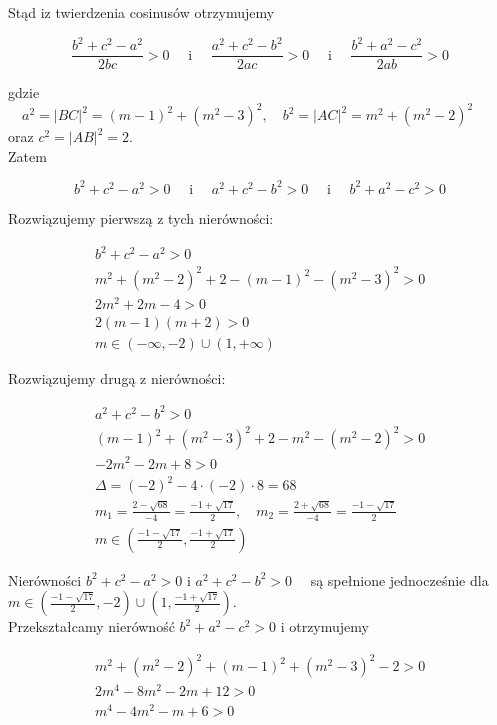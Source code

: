 \documentclass[10pt]{article}
\begin{document}
Stąd iz twierdzenia cosinusów otrzymujemy

$$
\frac{b^{2}+c^{2}-a^{2}}{2 b c}>0 \quad \text { i } \quad \frac{a^{2}+c^{2}-b^{2}}{2 a c}>0 \quad \text { i } \quad \frac{b^{2}+a^{2}-c^{2}}{2 a b}>0
$$

gdzie $\quad a^{2}=|B C|^{2}=(m-1)^{2}+\left(m^{2}-3\right)^{2}, \quad b^{2}=|A C|^{2}=m^{2}+\left(m^{2}-2\right)^{2} \quad$ oraz $c^{2}=|A B|^{2}=2$.\\
Zatem

$$
b^{2}+c^{2}-a^{2}>0 \quad \text { i } \quad a^{2}+c^{2}-b^{2}>0 \quad \text { i } \quad b^{2}+a^{2}-c^{2}>0
$$

Rozwiązujemy pierwszą z tych nierówności:

$$
\begin{gathered}
b^{2}+c^{2}-a^{2}>0 \\
m^{2}+\left(m^{2}-2\right)^{2}+2-(m-1)^{2}-\left(m^{2}-3\right)^{2}>0 \\
2 m^{2}+2 m-4>0 \\
2(m-1)(m+2)>0 \\
m \in(-\infty,-2) \cup(1,+\infty)
\end{gathered}
$$

Rozwiązujemy drugą z nierówności:

$$
\begin{gathered}
a^{2}+c^{2}-b^{2}>0 \\
(m-1)^{2}+\left(m^{2}-3\right)^{2}+2-m^{2}-\left(m^{2}-2\right)^{2}>0 \\
-2 m^{2}-2 m+8>0 \\
\Delta=(-2)^{2}-4 \cdot(-2) \cdot 8=68 \\
m_{1}=\frac{2-\sqrt{68}}{-4}=\frac{-1+\sqrt{17}}{2}, \quad m_{2}=\frac{2+\sqrt{68}}{-4}=\frac{-1-\sqrt{17}}{2} \\
m \in\left(\frac{-1-\sqrt{17}}{2}, \frac{-1+\sqrt{17}}{2}\right)
\end{gathered}
$$

Nierówności $b^{2}+c^{2}-a^{2}>0$ i $a^{2}+c^{2}-b^{2}>0 \quad$ są spełnione jednocześnie dla $m \in\left(\frac{-1-\sqrt{17}}{2},-2\right) \cup\left(1, \frac{-1+\sqrt{17}}{2}\right)$.\\
Przekształcamy nierówność $b^{2}+a^{2}-c^{2}>0$ i otrzymujemy

$$
\begin{gathered}
m^{2}+\left(m^{2}-2\right)^{2}+(m-1)^{2}+\left(m^{2}-3\right)^{2}-2>0 \\
2 m^{4}-8 m^{2}-2 m+12>0 \\
m^{4}-4 m^{2}-m+6>0
\end{gathered}
$$
\end{document}
